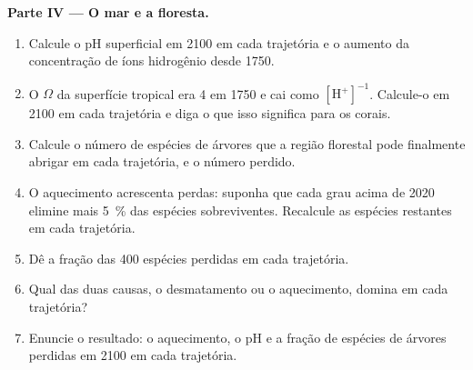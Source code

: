 \begin{problem}
\medskip
\noindent\textbf{Parte IV --- O mar e a floresta.}
\begin{enumerate}[resume]
  \item Calcule o pH superficial em 2100 em cada trajetória e o aumento
        da concentração de íons hidrogênio desde 1750.
  \item O  $\Omega$ da superfície tropical era
        4 em 1750 e cai como $[\ensuremath{\mathrm{H^{+}}}]^{-1}$. Calcule-o em 2100
        em cada trajetória e diga o que isso significa para os corais.
  \item Calcule o número de espécies de árvores que a região florestal
        pode finalmente abrigar em cada trajetória, e o número perdido.
  \item O aquecimento acrescenta perdas: suponha que cada grau acima de
        2020 elimine mais \qty{5}{\%} das espécies sobreviventes.
        Recalcule as espécies restantes em cada trajetória.
  \item Dê a fração das 400 espécies perdidas em cada trajetória.
  \item Qual das duas causas, o desmatamento ou o aquecimento, domina
        em cada trajetória?
  \item Enuncie o resultado: o aquecimento, o pH e a fração de
        espécies de árvores perdidas em 2100 em cada trajetória.
\end{enumerate}
\end{problem}

